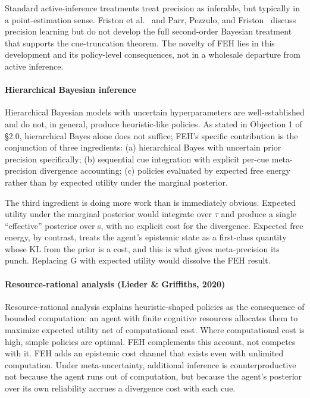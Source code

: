 \documentclass{article}
\begin{document}
Standard active-inference treatments treat precision as inferable, but
typically in a point-estimation sense. Friston et al.~\cite{friston2017} and Parr, Pezzulo, and Friston~\cite{parr2022} discuss precision learning but do not
develop the full second-order Bayesian treatment that supports the
cue-truncation theorem. The novelty of FEH lies in this development and
its policy-level consequences, not in a wholesale departure from active
inference.

\paragraph{Hierarchical Bayesian
inference}\label{hierarchical-bayesian-inference}

Hierarchical Bayesian models with uncertain hyperparameters are
well-established and do not, in general, produce heuristic-like
policies. As stated in Objection 1 of \S{}2.0, hierarchical Bayes alone
does not suffice; FEH's specific contribution is the conjunction of
three ingredients: (a) hierarchical Bayes with uncertain prior precision
specifically; (b) sequential cue integration with explicit per-cue
meta-precision divergence accounting; (c) policies evaluated by expected
free energy rather than by expected utility under the marginal
posterior.

The third ingredient is doing more work than is immediately obvious.
Expected utility under the marginal posterior would integrate over \ensuremath{\tau} and
produce a single ``effective'' posterior over s, with no explicit cost
for the divergence. Expected free energy, by contrast, treats the
agent's epistemic state as a first-class quantity whose KL from the
prior is a cost, and this is what gives meta-precision its punch.
Replacing G with expected utility would dissolve the FEH result.

\paragraph{Resource-rational analysis (Lieder \& Griffiths,
2020)}\label{resource-rational-analysis-lieder-griffiths-2020}

Resource-rational analysis explains heuristic-shaped policies as the
consequence of bounded computation: an agent with finite cognitive
resources allocates them to maximize expected utility net of
computational cost. Where computational cost is high, simple policies
are optimal. FEH complements this account, not competes with it. FEH
adds an epistemic cost channel that exists even with unlimited
computation. Under meta-uncertainty, additional inference is
counterproductive not because the agent runs out of computation, but
because the agent's posterior over its own reliability accrues a
divergence cost with each cue.
\end{document}
